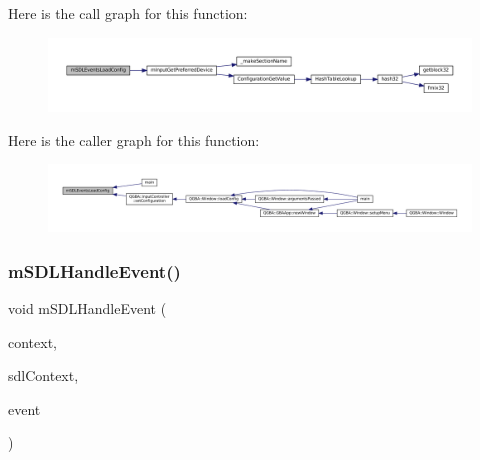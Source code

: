 Here is the call graph for this function\+:
\nopagebreak
\begin{figure}[H]
\begin{center}
\leavevmode
\includegraphics[width=350pt]{sdl-events_8c_aef6ce1dc9e5c4e9541747a55dc1ee383_cgraph}
\end{center}
\end{figure}
Here is the caller graph for this function\+:
\nopagebreak
\begin{figure}[H]
\begin{center}
\leavevmode
\includegraphics[width=350pt]{sdl-events_8c_aef6ce1dc9e5c4e9541747a55dc1ee383_icgraph}
\end{center}
\end{figure}
\mbox{\label{sdl-events_8c_a32623e2272fd40a24e3941e351a273a4}} 
\subsubsection{\texorpdfstring{m\+S\+D\+L\+Handle\+Event()}{mSDLHandleEvent()}}
{\footnotesize\ttfamily void m\+S\+D\+L\+Handle\+Event (\begin{DoxyParamCaption}\item[{struct m\+Core\+Thread $\ast$}]{context,  }\item[{struct \mbox{\hyperlink{sdl-events_8h_structm_s_d_l_player}{m\+S\+D\+L\+Player}} $\ast$}]{sdl\+Context,  }\item[{const union S\+D\+L\+\_\+\+Event $\ast$}]{event }\end{DoxyParamCaption})}

